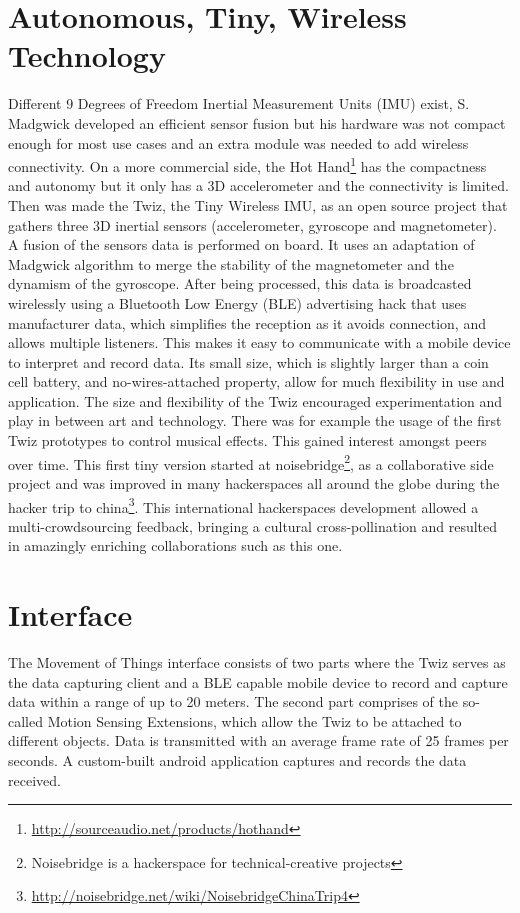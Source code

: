 \documentclass{sigchi}
\begin{document}
\section{Autonomous, Tiny, Wireless Technology}

Different 9 Degrees of Freedom Inertial Measurement Units
(IMU) exist, S. Madgwick\cite {madgwick} developed an
efficient sensor fusion but his hardware was not compact
enough for most use cases and an extra module was needed
to add wireless connectivity.
On a more commercial side, the Hot Hand\footnote
{\url{http://sourceaudio.net/products/hothand}} has the compactness
and autonomy but it only has a 3D accelerometer and the
connectivity is limited.
Then was made the Twiz, the Tiny Wireless IMU, as an open
source project that gathers three 3D inertial sensors
(accelerometer, gyroscope and magnetometer).
A fusion of the sensors data is performed on board.
It uses an adaptation of Madgwick algorithm to
merge the stability of the magnetometer and the
dynamism of the gyroscope. After being processed, this
data is broadcasted wirelessly using a Bluetooth Low
Energy (BLE) advertising hack that uses manufacturer
data, which simplifies the reception as it avoids
connection, and allows multiple listeners. This makes it
easy to communicate with a mobile device to interpret
and record data. Its small size, which is slightly larger
than a coin cell battery, and no-wires-attached
property, allow for much flexibility in use and
application.
The size and flexibility of the Twiz encouraged
experimentation and play in between art and
technology. There was for example the usage of the
first Twiz prototypes to control musical effects. This
gained interest amongst peers over time. This first tiny
version started at noisebridge\footnote{Noisebridge is a
hackerspace for technical-creative projects}, as a collaborative
side project and was improved in many hackerspaces all
around the globe during the hacker trip to china\footnote
{\url{http://noisebridge.net/wiki/NoisebridgeChinaTrip4}}.
This international hackerspaces development allowed a
multi-crowdsourcing feedback, bringing a cultural
cross-pollination and resulted in amazingly enriching
collaborations such as this one.

\section{Interface}

The Movement of Things interface consists of two parts
where the Twiz serves as the data capturing client and a
BLE capable mobile device to record and capture data
within a range of up to 20 meters. The second part
comprises of the so-called Motion Sensing Extensions,
which allow the Twiz to be attached to different objects.
Data is transmitted with an average frame rate of 25
frames per seconds. A custom-built android application
captures and records the data received.
\end{document}
